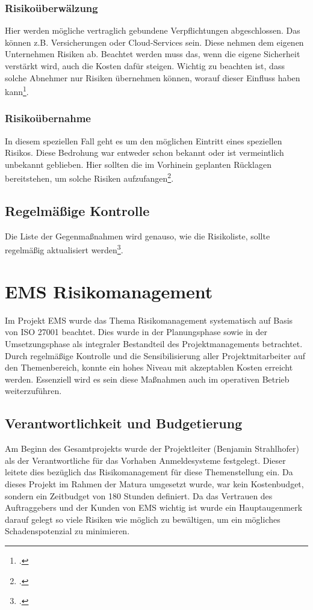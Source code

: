 \subsubsection{Risikoüberwälzung}
Hier werden mögliche vertraglich gebundene Verpflichtungen abgeschlossen. Das können z.B. Versicherungen oder Cloud-Services sein. Diese nehmen dem eigenen Unternehmen Risiken ab. Beachtet werden muss das, wenn die eigene Sicherheit verstärkt wird, auch die Kosten dafür steigen. Wichtig zu beachten ist, dass solche Abnehmer nur Risiken übernehmen können, worauf dieser Einfluss haben kann\footcite{risikomanagement-diplomarbeit}.

\subsubsection{Risikoübernahme}
In diesem speziellen Fall geht es um den möglichen Eintritt eines speziellen Risikos. Diese Bedrohung war entweder schon bekannt oder ist vermeintlich unbekannt geblieben. Hier sollten die im Vorhinein geplanten Rücklagen bereitstehen, um solche Risiken aufzufangen\footcite{risikomanagement-diplomarbeit}.

\subsection{Regelmäßige Kontrolle}
Die Liste der Gegenmaßnahmen wird genauso, wie die Risikoliste, sollte regelmäßig aktualisiert werden\footcite{bva-risikomanagement}.  

\section{EMS Risikomanagement}
Im Projekt EMS wurde das Thema Risikomanagement systematisch auf Basis von ISO 27001 beachtet. Dies wurde in der Planungsphase sowie in der Umsetzungsphase als integraler Bestandteil des Projektmanagements betrachtet. Durch regelmäßige Kontrolle und die Sensibilisierung aller Projektmitarbeiter auf den Themenbereich, konnte ein hohes Niveau mit akzeptablen Kosten erreicht werden. Essenziell wird es sein diese Maßnahmen auch im operativen Betrieb weiterzuführen.

\subsection{Verantwortlichkeit und Budgetierung}
Am Beginn des Gesamtprojekts wurde der Projektleiter (Benjamin Strahlhofer) als der Verantwortliche für das Vorhaben Anmeldesysteme festgelegt. Dieser leitete dies bezüglich das Risikomanagement für diese Themenstellung ein.
Da dieses Projekt im Rahmen der Matura umgesetzt wurde, war kein Kostenbudget, sondern ein Zeitbudget von 180 Stunden definiert. Da das Vertrauen des Auftraggebers und der Kunden von EMS wichtig ist wurde ein Hauptaugenmerk darauf gelegt so viele Risiken wie möglich zu bewältigen, um ein mögliches Schadenspotenzial zu minimieren.


